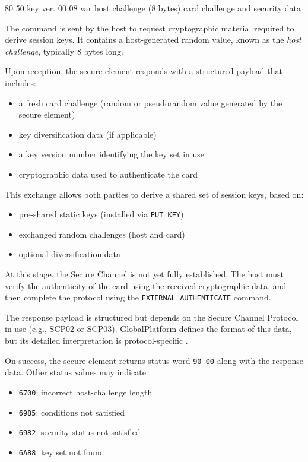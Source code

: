 \apdudesc
{80}
{50}
{key ver.}
{00}
{08}
{var}
{host challenge (8 bytes)}
{card challenge and security data}

The command is sent by the host to request cryptographic material required to
derive session keys. It contains a host-generated random value, known as the
\emph{host challenge}, typically 8 bytes long.

Upon reception, the secure element responds with a structured payload that
includes:
\begin{itemize}
\item a fresh card challenge (random or pseudorandom value generated by the secure element)
\item key diversification data (if applicable)
\item a key version number identifying the key set in use
\item cryptographic data used to authenticate the card
\end{itemize}

This exchange allows both parties to derive a shared set of session keys, based
on:
\begin{itemize}
\item pre-shared static keys (installed via \texttt{PUT KEY})
\item exchanged random challenges (host and card)
\item optional diversification data
\end{itemize}

At this stage, the Secure Channel is not yet fully established. The host must
verify the authenticity of the card using the received cryptographic data, and
then complete the protocol using the \texttt{EXTERNAL AUTHENTICATE} command.

The response payload is structured but depends on the Secure Channel Protocol
in use (e.g., SCP02 or SCP03). GlobalPlatform defines the format of this data,
but its detailed interpretation is protocol-specific .

On success, the secure element returns status word \texttt{90 00} along with the response
data.  Other status values may indicate:
\begin{itemize}
\item \texttt{6700}: incorrect host-challenge length
\item \texttt{6985}: conditions not satisfied
\item \texttt{6982}: security status not satisfied
\item \texttt{6A88}: key set not found
\end{itemize}

